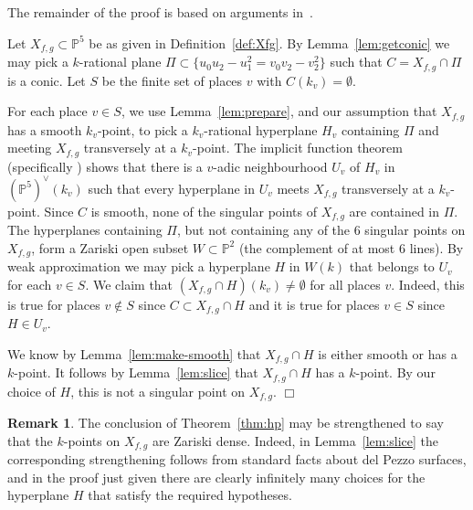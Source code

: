 \documentclass[12pt]{amsart}
\newcommand{\PP}{{\mathbb P}}
\newenvironment{ProofOf}[1]{\par\noindent{\em Proof of #1.}}%
                        {\hspace*{\fill}\nobreak$\Box$\par\medskip}
\theoremstyle{definition}
\newtheorem{Remark}[Proposition]{Remark}
\begin{document}
The remainder of the proof is based on arguments
in~\cite[Section~2]{Sal}.

\medskip

\begin{ProofOf}{Theorem~\ref{thm:hp}}
  Let $X_{f,g} \subset \PP^5$ be as given in Definition~\ref{def:Xfg}.
  By Lemma~\ref{lem:getconic} we may pick a $k$-rational plane
  $\Pi \subset \{ u_0 u_2 - u_1^2 = v_0 v_2 - v_2^2 \}$ such that
  $C = X_{f,g} \cap \Pi$ is a conic.  Let $S$ be the finite set of
  places $v$ with $C(k_v) = \emptyset$.
  
  For each place $v \in S$, we use Lemma~\ref{lem:prepare}, and our
  assumption that $X_{f,g}$ has a smooth $k_v$-point, to pick a
  $k_v$-rational hyperplane $H_v$ containing $\Pi$ and meeting
  $X_{f,g}$ transversely at a $k_v$-point.  The implicit function
  theorem (specifically \cite[Proposition 6.2]{CSS}) shows that there
  is a $v$-adic neighbourhood $U_v$ of $H_v$ in $(\PP^5)^\vee(k_v)$
  such that every hyperplane in $U_v$ meets $X_{f,g}$ transversely at
  a $k_v$-point.  Since $C$ is smooth, none of the singular points of
  $X_{f,g}$ are contained in $\Pi$. The hyperplanes containing $\Pi$,
  but not containing any of the $6$ singular points on $X_{f,g}$, form
  a Zariski open subset $W \subset \PP^2$ (the complement of at most
  $6$ lines).  By weak approximation we may pick a hyperplane $H$ in
  $W(k)$ that belongs to $U_v$ for each $v \in S$. We claim that
  $(X_{f,g} \cap H)(k_v) \not= \emptyset$ for all places $v$.  Indeed,
  this is true for places $v \not\in S$ since
  $C \subset X_{f,g} \cap H$ and it is true for places $v \in S$ since
  $H \in U_v$.

  We know by Lemma~\ref{lem:make-smooth} that $X_{f,g} \cap H$ is
  either smooth or has a $k$-point. It follows by
  Lemma~\ref{lem:slice} that $X_{f,g} \cap H$ has a $k$-point. By our
  choice of $H$, this is not a singular point on $X_{f,g}$.
\end{ProofOf}

\begin{Remark}
\label{rem:density}
The conclusion of Theorem~\ref{thm:hp} may be strengthened to say that
the $k$-points on $X_{f,g}$ are Zariski dense.  Indeed, in
Lemma~\ref{lem:slice} the corresponding strengthening follows from
standard facts about del Pezzo surfaces, and in the proof just given
there are clearly infinitely many choices for the hyperplane $H$ that
satisfy the required hypotheses.
\end{Remark}
\end{document}
